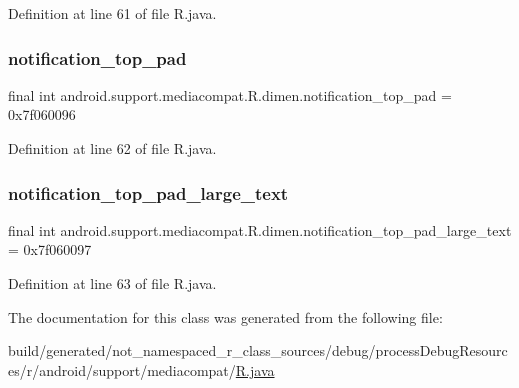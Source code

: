 Definition at line 61 of file R.\+java.

\mbox{\label{classandroid_1_1support_1_1mediacompat_1_1_r_1_1dimen_a8d53f4907024b74a93cc91933e4a17cf}} 
\subsubsection{\texorpdfstring{notification\_top\_pad}{notification\_top\_pad}}
{\footnotesize\ttfamily final int android.\+support.\+mediacompat.\+R.\+dimen.\+notification\+\_\+top\+\_\+pad = 0x7f060096\hspace{0.3cm}{\ttfamily [static]}}



Definition at line 62 of file R.\+java.

\mbox{\label{classandroid_1_1support_1_1mediacompat_1_1_r_1_1dimen_ac39512633a675b7520b8378ea26cd24b}} 
\subsubsection{\texorpdfstring{notification\_top\_pad\_large\_text}{notification\_top\_pad\_large\_text}}
{\footnotesize\ttfamily final int android.\+support.\+mediacompat.\+R.\+dimen.\+notification\+\_\+top\+\_\+pad\+\_\+large\+\_\+text = 0x7f060097\hspace{0.3cm}{\ttfamily [static]}}



Definition at line 63 of file R.\+java.



The documentation for this class was generated from the following file\+:\begin{DoxyCompactItemize}
\item 
build/generated/not\+\_\+namespaced\+\_\+r\+\_\+class\+\_\+sources/debug/process\+Debug\+Resources/r/android/support/mediacompat/\mbox{\hyperlink{android_2support_2mediacompat_2_r_8java}{R.\+java}}\end{DoxyCompactItemize}
